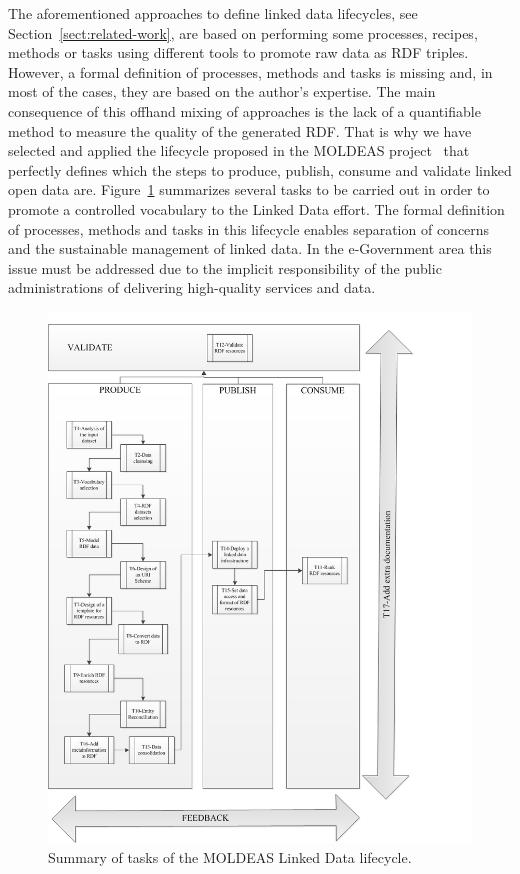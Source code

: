 The aforementioned approaches to define linked data lifecycles, see Section~\ref{sect:related-work}, are based on performing some processes, 
recipes, methods or tasks using different tools to promote raw data as RDF triples. However, a formal definition of processes, 
methods and tasks is missing and, in most of the cases, they are based on the author’s expertise. The main consequence 
of this offhand mixing of approaches is the lack of a quantifiable method to measure the quality of the generated RDF. 
That is why we have selected and applied the lifecycle proposed in the MOLDEAS project~\cite{DBLP:journals/ijseke/AlvarezLSASL12}
that perfectly defines which the steps to produce, publish, consume and validate linked open data are. Figure~\ref{fig:summary-tasks} summarizes several 
tasks to be carried out in order to promote a controlled vocabulary to the Linked Data effort. The formal definition of processes, 
methods and tasks in this lifecycle enables separation of concerns and the sustainable management of linked data. In the e-Government 
area this issue must be addressed due to the implicit responsibility of the public administrations of delivering high-quality services and data.

\begin{figure}[!ht]
\centering
	\includegraphics[width=\textwidth]{./imgs/fig-1}
 \caption{Summary of tasks of the MOLDEAS Linked Data lifecycle.}
 \label{fig:summary-tasks}
\end{figure}




